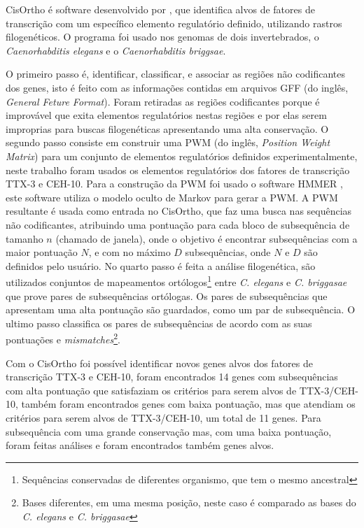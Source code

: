 CisOrtho é software desenvolvido por \cite{Bigelow2004CisOrtho}, que identifica alvos de fatores de transcrição com um específico elemento regulatório definido, utilizando rastros filogenéticos. O programa foi usado nos genomas de dois invertebrados, o \textit{Caenorhabditis elegans} e o \textit{Caenorhabditis briggsae}.

O primeiro passo é, identificar, classificar, e associar as regiões não codificantes dos genes, isto é feito com as informações contidas em arquivos GFF (do inglês, \textit{General Feture Format}). Foram retiradas as regiões codificantes porque é improvável que exita elementos regulatórios nestas regiões e por elas serem improprias para buscas filogenéticas apresentando uma alta conservação. O segundo passo consiste em construir uma PWM (do inglês, \textit{Position Weight Matrix}) para um conjunto de elementos regulatórios definidos experimentalmente, neste trabalho foram usados os elementos regulatórios dos fatores de transcrição TTX-3 e CEH-10. Para a construção da PWM foi usado o software HMMER \cite{Eddy1998}, este software utiliza o modelo oculto de Markov para gerar a PWM. A PWM resultante é usada como entrada no CisOrtho, que faz uma busca nas sequências não codificantes, atribuindo uma pontuação para cada bloco de subsequência de tamanho $n$ (chamado de janela), onde o objetivo é encontrar subsequências com a maior pontuação $N$, e com no máximo $D$ subsequências, onde $N$ e $D$ são definidos pelo usuário. No quarto passo é feita a análise filogenética, são utilizados conjuntos de mapeamentos ortólogos\footnote{Sequências conservadas de diferentes organismo, que tem o mesmo ancestral} entre \textit{C. elegans} e \textit{C. briggasae} que prove pares de subsequências ortólogas. Os pares de subsequências que apresentam uma alta pontuação são guardados, como um par de subsequência. O ultimo passo classifica os pares de subsequências  de acordo com as suas pontuações e \textit{mismatches}\footnote{Bases diferentes, em uma mesma posição, neste caso é comparado as bases do \textit{C. elegans} e \textit{C. briggasae}}.

Com o CisOrtho foi possível identificar novos genes alvos dos fatores de transcrição TTX-3 e CEH-10, foram encontrados 14 genes com subsequências com alta pontuação que satisfaziam os critérios para serem alvos de TTX-3/CEH-10, também foram encontrados genes com baixa pontuação, mas que atendiam os critérios para serem alvos de TTX-3/CEH-10, um total de 11 genes. Para subsequência com uma grande conservação mas, com uma baixa pontuação, foram feitas análises e foram encontrados também genes alvos.




